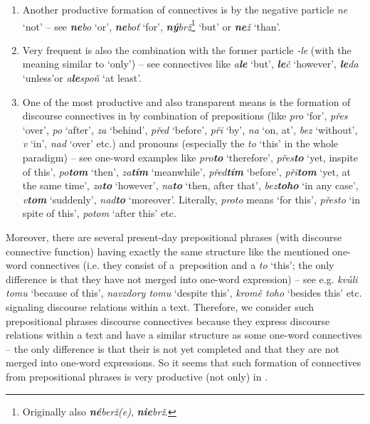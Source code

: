 \documentclass[output=paper]{langsci/langscibook.cls}
\begin{document}
\begin{enumerate}
\item Another productive formation of connectives is by the negative particle \textit{ne} `not' – see \textbf{\textit{ne}}\textit{bo} `or', \textbf{\textit{ne}}\textit{boť} `for', \textbf{\textit{ný}}\textit{brž}\footnote{ Originally also \textbf{\textit{né}}\textit{berž(e)}, \textbf{\textit{nie}}\textit{brž}. } `but' or \textbf{\textit{ne}}\textit{ž }`than'.


\item Very frequent is also the combination with the former particle \textit{{}-le} (with the meaning similar to `only') – see connectives like \textit{a}\textbf{\textit{le}} `but', \textbf{\textit{le}}\textit{č} `however', \textbf{\textit{le}}\textit{da} `unless'or \textit{a}\textbf{\textit{le}}\textit{spoň} `at least'.


\item One of the most productive and also transparent means is the formation of discourse connectives in  by combination of prepositions (like \textit{pro} `for', \textit{přes} `over', \textit{po} `after', \textit{za} `behind', \textit{před} `before', \textit{při} `by', \textit{na} `on, at', \textit{bez }`without', \textit{v} `in', \textit{nad} `over' etc.) and pronouns (especially the  \textit{to} `this' in the whole paradigm) – see one-word examples like \textit{pro}\textbf{\textit{to}}\textbf{ }`therefore', \textit{přes}\textbf{\textit{to}} `yet, inspite of this', \textit{po}\textbf{\textit{tom }}`then', \textit{za}\textbf{\textit{tím}} `meanwhile', \textit{před}\textbf{\textit{tím}}\textbf{ }`before', \textit{při}\textbf{\textit{tom}} `yet, at the same time', \textit{za}\textbf{\textit{to }}`however', \textit{na}\textbf{\textit{to}}\textbf{ }`then, after that', \textit{bez}\textbf{\textit{toho}} `in any case', \textit{v}\textbf{\textit{tom}} `suddenly', \textit{nad}\textbf{\textit{to}} `moreover'. Literally, \textit{proto} means `for this', \textit{přesto} `in spite of this', \textit{potom} `after this' etc. 

\end{enumerate}

Moreover, there are several present-day prepositional phrases (with discourse connective function) having exactly the same structure like the mentioned one-word connectives (i.e. they consist of a~preposition and a  \textit{to} `this'; the only difference is that they have not merged into one-word expression) – see e.g. \textit{kvůli tomu} `because of this', \textit{navzdory tomu} `despite this', \textit{kromě toho} `besides this' etc. signaling discourse relations within a text. Therefore, we consider such prepositional phrases discourse connectives because they express discourse relations within a text and have a similar structure as some one-word connectives – the only difference is that their  is not yet completed and that they are not merged into one-word expressions. So it seems that such formation of connectives from prepositional phrases is very productive (not only) in . 
\end{document}
